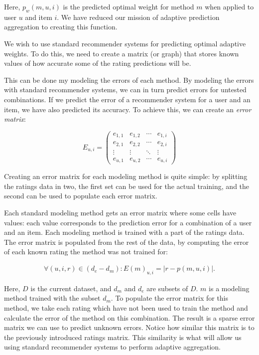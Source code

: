 Here, $p_w(m,u,i)$ is the predicted optimal weight for method $m$ when applied to user $u$ and item $i$.
We have reduced our mission of adaptive prediction aggregation to creating this function.

We wish to use standard recommender systems for predicting optimal adaptive weights.
To do this, we need to create a matrix (or graph)
that stores known values of how accurate some of the rating predictions will be.

This can be done my modeling the errors of each method.
By modeling the errors with standard recommender systems,
we can in turn predict errors for untested combinations.
If we predict the error of a recommender system for a user and an item,
we have also predicted its accuracy.
To achieve this, we can create an \emph{error matrix}:

\begin{equation*}
 E_{u,i} =
 \begin{pmatrix}
    e_{1,1} & e_{1,2} & \cdots & e_{1,i} \\
    e_{2,1} & e_{2,2} & \cdots & e_{2,i} \\
    \vdots  & \vdots  & \ddots & \vdots  \\
    e_{u,1} & e_{u,2} & \cdots & e_{u,i}
 \end{pmatrix}
\end{equation*}

Creating an error matrix for each modeling method is quite simple:
by splitting the ratings data in two,
the first set can be used for the actual training, and the second
can be used to populate each error matrix.

Each standard modeling method gets an error matrix where some cells have values:
each value corresponds to the prediction error for a combination of a user and an item.
Each modeling method is trained with a part of the ratings data.
The error matrix is populated from the rest of the data,
by computing the error of each known rating the method was not trained for:

\begin{eqnarray*}
  \forall (u,i,r) \in (d_e - d_m): E(m)_{u,i} = |r - p(m,u,i)|.
\end{eqnarray*}

Here, $D$ is the current dataset, and
$d_m$ and $d_e$ are subsets of $D$.
$m$ is a modeling method trained with the subset $d_m$.
To populate the error matrix for this method,
we take each rating which have not been used to train the method
and calculate the error of the method on this combination.
The result is a sparse error matrix
we can use to predict unknown errors.
Notice how similar this matrix is to the previously introduced ratings matrix.
This similarity is what will allow us using standard recommender systems
to perform adaptive aggregation.


